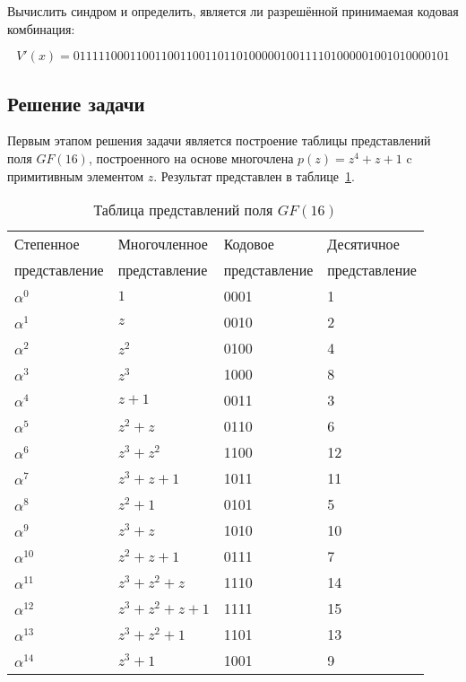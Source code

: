 Вычислить синдром и определить, является ли разрешённой принимаемая
кодовая комбинация:

\begin{equation*}
  V'(x) = 011111000110011001100110110100000100111101000001001010000101
\end{equation*}

\subsection{Решение задачи}

Первым этапом решения задачи является построение таблицы представлений
поля $GF(16)$, построенного на основе многочлена $p(z)=z^4+z+1$ c
примитивным элементом $z$. Результат представлен в
таблице~\ref{tab:predst_gf16}.

\begin{table}[h!]
  \caption{Таблица представлений поля $GF(16)$}
  \label{tab:predst_gf16}
  \begin{tabular}{|l|l|l|l|}
    \hline
    Степенное & Многочленное & Кодовое & Десятичное \\
    представление & представление & представление & представление \\\hline
    $\alpha^0   $ & $1          $ & 0001 & 1 \\\hline
    $\alpha^1   $ & $z          $ & 0010 & 2 \\\hline
    $\alpha^2   $ & $z^2        $ & 0100 & 4 \\\hline
    $\alpha^3   $ & $z^3        $ & 1000 & 8 \\\hline
    $\alpha^4   $ & $z+1        $ & 0011 & 3 \\\hline
    $\alpha^5   $ & $z^2+z      $ & 0110 & 6 \\\hline
    $\alpha^6   $ & $z^3+z^2    $ & 1100 & 12 \\\hline
    $\alpha^7   $ & $z^3+z+1    $ & 1011 & 11 \\\hline
    $\alpha^8   $ & $z^2+1      $ & 0101 & 5 \\\hline
    $\alpha^9   $ & $z^3+z      $ & 1010 & 10 \\\hline
    $\alpha^{10}$ & $z^2+z+1    $ & 0111 & 7 \\\hline
    $\alpha^{11}$ & $z^3+z^2+z  $ & 1110 & 14 \\\hline
    $\alpha^{12}$ & $z^3+z^2+z+1$ & 1111 & 15 \\\hline
    $\alpha^{13}$ & $z^3+z^2+1  $ & 1101 & 13 \\\hline
    $\alpha^{14}$ & $z^3+1      $ & 1001 & 9 \\\hline
  \end{tabular}
\end{table}

